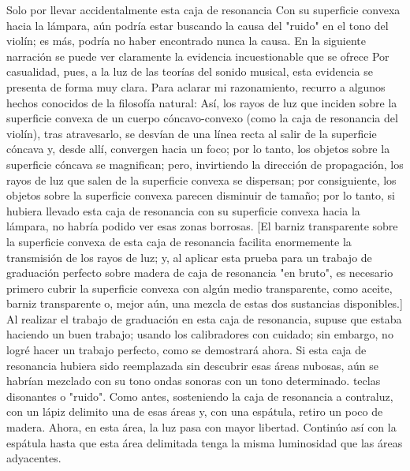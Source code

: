 Solo por llevar accidentalmente esta caja de resonancia
Con su superficie convexa hacia la lámpara, aún podría estar buscando la causa del "ruido" en el tono del violín; es más, podría no haber encontrado nunca la causa. En la siguiente narración se puede ver claramente la evidencia incuestionable que se ofrece 
Por casualidad, pues, a la luz de las teorías del sonido musical, esta evidencia se presenta de forma muy clara.
Para aclarar mi razonamiento, recurro a algunos hechos conocidos de la filosofía natural: Así, los rayos de luz que inciden sobre la superficie convexa de un cuerpo cóncavo-convexo (como la caja de resonancia del violín), tras atravesarlo, se desvían de una línea recta al salir de la superficie cóncava y, desde allí, convergen hacia un foco; por lo tanto, los objetos sobre la superficie cóncava se magnifican; pero, invirtiendo la dirección de propagación, los rayos de luz que salen de la superficie convexa se dispersan; por consiguiente, los objetos sobre la superficie convexa parecen disminuir de tamaño; por lo tanto, si hubiera llevado esta caja de resonancia con su superficie convexa hacia la lámpara, no habría podido ver esas zonas borrosas. [El barniz transparente sobre la superficie convexa de esta caja de resonancia facilita enormemente la transmisión de los rayos de luz; y, al aplicar esta prueba para un trabajo de graduación perfecto sobre madera de caja de resonancia "en bruto", es necesario primero cubrir la superficie convexa con algún medio transparente, como aceite, barniz transparente o, mejor aún, una mezcla de estas dos sustancias disponibles.]
Al realizar el trabajo de graduación en esta caja de resonancia, supuse que estaba haciendo un buen trabajo; usando los calibradores con cuidado; sin embargo, no logré hacer un trabajo perfecto, como se demostrará ahora. Si esta caja de resonancia hubiera sido reemplazada sin descubrir esas áreas nubosas, aún se habrían mezclado con su tono ondas sonoras con un tono determinado.
teclas disonantes o "ruido". Como antes, sosteniendo la caja de resonancia a contraluz, con un lápiz delimito una de esas áreas y, con una espátula, retiro un poco de madera. Ahora, en esta área, la luz pasa con mayor libertad. Continúo así con la espátula hasta que esta área delimitada tenga la misma luminosidad que las áreas adyacentes.
